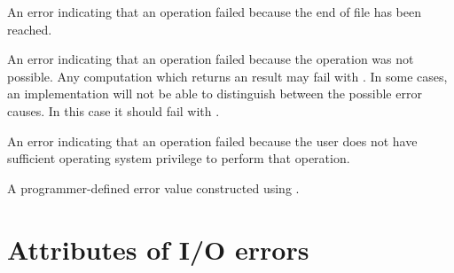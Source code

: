 \begin{haddockdesc}
\item[\begin{tabular}{@{}l}
isEOFError :: IOError -> Bool
\end{tabular}]
{\haddockbegindoc
An error indicating that an  operation failed because
 the end of file has been reached.\par}
\end{haddockdesc}
\begin{haddockdesc}
\item[\begin{tabular}{@{}l}
isIllegalOperation :: IOError -> Bool
\end{tabular}]
{\haddockbegindoc
An error indicating that an  operation failed because
 the operation was not possible.
 Any computation which returns an  result may fail with
 .  In some cases, an implementation will not be
 able to distinguish between the possible error causes.  In this case
 it should fail with .\par}
\end{haddockdesc}
\begin{haddockdesc}
\item[\begin{tabular}{@{}l}
isPermissionError :: IOError -> Bool
\end{tabular}]
{\haddockbegindoc
An error indicating that an  operation failed because
 the user does not have sufficient operating system privilege
 to perform that operation.\par}
\end{haddockdesc}
\begin{haddockdesc}
\item[\begin{tabular}{@{}l}
isUserError :: IOError -> Bool
\end{tabular}]
{\haddockbegindoc
A programmer-defined error value constructed using .\par}
\end{haddockdesc}
\section{Attributes of I/O errors}
\begin{haddockdesc}
\item[\begin{tabular}{@{}l}
ioeGetErrorString :: IOError -> String
\end{tabular}]
\item[\begin{tabular}{@{}l}
ioeGetHandle :: IOError -> Maybe Handle
\end{tabular}]
\item[\begin{tabular}{@{}l}
ioeGetFileName :: IOError -> Maybe FilePath
\end{tabular}]
\end{haddockdesc}
